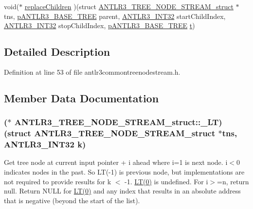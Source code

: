 \begin{DoxyCompactItemize}
\item 
void($\ast$ \hyperlink{struct_a_n_t_l_r3___t_r_e_e___n_o_d_e___s_t_r_e_a_m__struct_a445e9d8e9cf809a0d8dd1d7a96d5ddd1}{replace\-Children} )(struct \hyperlink{struct_a_n_t_l_r3___t_r_e_e___n_o_d_e___s_t_r_e_a_m__struct}{A\-N\-T\-L\-R3\-\_\-\-T\-R\-E\-E\-\_\-\-N\-O\-D\-E\-\_\-\-S\-T\-R\-E\-A\-M\-\_\-struct} $\ast$tns, \hyperlink{antlr3interfaces_8h_a6313a8a3e8f044398a393bd10c083852}{p\-A\-N\-T\-L\-R3\-\_\-\-B\-A\-S\-E\-\_\-\-T\-R\-E\-E} parent, \hyperlink{antlr3defs_8h_a6faef5c4687f8eb633d2aefea93973ca}{A\-N\-T\-L\-R3\-\_\-\-I\-N\-T32} start\-Child\-Index, \hyperlink{antlr3defs_8h_a6faef5c4687f8eb633d2aefea93973ca}{A\-N\-T\-L\-R3\-\_\-\-I\-N\-T32} stop\-Child\-Index, \hyperlink{antlr3interfaces_8h_a6313a8a3e8f044398a393bd10c083852}{p\-A\-N\-T\-L\-R3\-\_\-\-B\-A\-S\-E\-\_\-\-T\-R\-E\-E} \hyperlink{showimage_8m_ad941f6ef920fbfb3d75b60ddbedbdd39}{t})
\end{DoxyCompactItemize}


\subsection{Detailed Description}


Definition at line 53 of file antlr3commontreenodestream.\-h.



\subsection{Member Data Documentation}
\hypertarget{struct_a_n_t_l_r3___t_r_e_e___n_o_d_e___s_t_r_e_a_m__struct_a7e187756cb02b552ce74845ad283c29f}{
\subsubsection[{\-\_\-\-L\-T}]{($\ast$ A\-N\-T\-L\-R3\-\_\-\-T\-R\-E\-E\-\_\-\-N\-O\-D\-E\-\_\-\-S\-T\-R\-E\-A\-M\-\_\-struct\-::\-\_\-\-L\-T)(struct {\bf A\-N\-T\-L\-R3\-\_\-\-T\-R\-E\-E\-\_\-\-N\-O\-D\-E\-\_\-\-S\-T\-R\-E\-A\-M\-\_\-struct} $\ast$tns, {\bf A\-N\-T\-L\-R3\-\_\-\-I\-N\-T32} k)}}\label{struct_a_n_t_l_r3___t_r_e_e___n_o_d_e___s_t_r_e_a_m__struct_a7e187756cb02b552ce74845ad283c29f}
Get tree node at current input pointer + i ahead where i=1 is next node. i$<$0 indicates nodes in the past. So L\-T(-\/1) is previous node, but implementations are not required to provide results for k $<$ -\/1. \hyperlink{cif_parser_8cpp_a835a564399f4498da6ccbef2dcdd277e}{L\-T(0)} is undefined. For i$>$=n, return null. Return N\-U\-L\-L for \hyperlink{cif_parser_8cpp_a835a564399f4498da6ccbef2dcdd277e}{L\-T(0)} and any index that results in an absolute address that is negative (beyond the start of the list).


